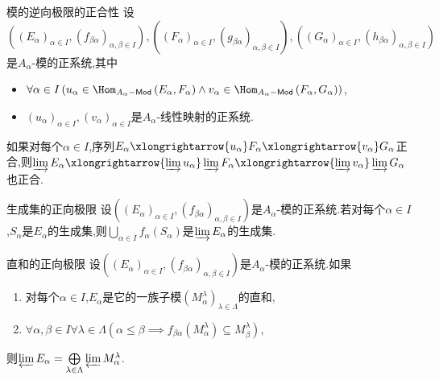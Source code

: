 \begin{proposition}{模的逆向极限的正合性}{}
	设$\left(\left(E_{\alpha}\right)_{\alpha\in I},\left(f_{\beta\alpha}\right)_{\alpha,\beta\in I}\right),\left(\left(F_{\alpha}\right)_{\alpha\in I},\left(g_{\beta\alpha}\right)_{\alpha,\beta\in I}\right),\left(\left(G_{\alpha}\right)_{\alpha\in I},\left(h_{\beta\alpha}\right)_{\alpha,\beta\in I}\right)$是$A_{\alpha}$-模的正系统,其中
	\begin{itemize}
		\item $\forall\alpha\in I\left(u_{\alpha}\in\Hom_{A_{\alpha}-\mathsf{Mod}}\left(E_{\alpha},F_{\alpha}\right)\wedge v_{\alpha}\in\Hom_{A_{\alpha}-\mathsf{Mod}}\left(F_{\alpha},G_{\alpha}\right)\right)$,
		\item $\left(u_{\alpha}\right)_{\alpha\in I},\left(v_{\alpha}\right)_{\alpha\in I}$是$A_{\alpha}$-线性映射的正系统.
	\end{itemize}
	如果对每个$\alpha\in I$,序列$E_{\alpha}\xlongrightarrow{u_{\alpha}}F_{\alpha}\xlongrightarrow{v_{\alpha}}G_{\alpha}$正合,则$\varinjlim E_{\alpha}\xlongrightarrow{\varinjlim u_{\alpha}}\varinjlim F_{\alpha}\xlongrightarrow{\varinjlim v_{\alpha}}\varinjlim G_{\alpha}$也正合.
\end{proposition}

\begin{proposition}{生成集的正向极限}{}
	设$\left(\left(E_{\alpha}\right)_{\alpha\in I},\left(f_{\beta\alpha}\right)_{\alpha,\beta\in I}\right)$是$A_{\alpha}$-模的正系统.若对每个$\alpha\in I$,$S_{\alpha}$是$E_{\alpha}$的生成集,则$\bigcup\limits_{\alpha\in I}f_{\alpha}\left(S_{\alpha}\right)$是$\varinjlim E_{\alpha}$的生成集.
\end{proposition}

\begin{proposition}{直和的正向极限}{}
	设$\left(\left(E_{\alpha}\right)_{\alpha\in I},\left(f_{\beta\alpha}\right)_{\alpha,\beta\in I}\right)$是$A_{\alpha}$-模的正系统.如果
	\begin{enumerate}
		\item 对每个$\alpha\in I$,$E_{\alpha}$是它的一族子模$\left(M_{\alpha}^{\lambda}\right)_{\lambda\in\Lambda}$的直和,
		\item $\forall\alpha,\beta\in I\forall\lambda\in\Lambda\left(\alpha\leq\beta\implies f_{\beta\alpha}\left(M_{\alpha}^{\lambda}\right)\subseteq M_{\beta}^{\lambda}\right)$,
	\end{enumerate}
	则$\varprojlim E_{\alpha}=\bigoplus\limits_{\lambda\in\Lambda}\varprojlim M_{\alpha}^{\lambda}$.
\end{proposition}

